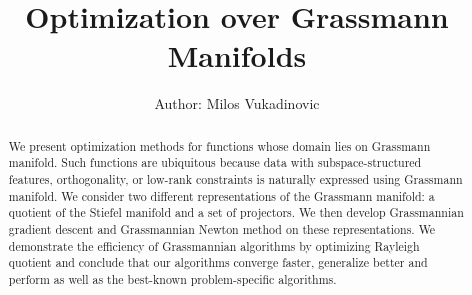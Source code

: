 \documentclass[11pt,a4paper]{report}
\title{Optimization over Grassmann Manifolds}
\author{Author: Milos Vukadinovic}
\date{\parbox{\linewidth}{\centering%
  \endgraf\bigskip
  Advisor: Peter Dalakov \endgraf\medskip
  \bigskip
  Department\ of Mathematics,  \endgraf
  American University in Bulgaria \endgraf
  \bigskip
  \today}}
\begin{document}
\maketitle

\begin{abstract}
We present optimization methods for functions whose domain lies on Grassmann manifold.
Such functions are ubiquitous because data with subspace-structured features, orthogonality, or low-rank constraints is naturally expressed using Grassmann manifold.
We consider two different representations of the Grassmann manifold: a quotient of the Stiefel manifold and a set of projectors.
We then develop Grassmannian gradient descent and Grassmannian Newton method on these representations.
We demonstrate the efficiency of Grassmannian algorithms by optimizing Rayleigh quotient and conclude that our algorithms converge faster,
generalize better and perform as well as the best-known problem-specific algorithms. 
\end{abstract}

\setcounter{tocdepth}{1}
\tableofcontents
\end{document}
